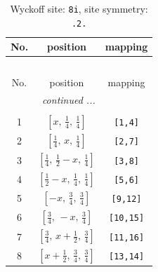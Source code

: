 \documentclass[fleqn,8pt]{jsarticle}
\begin{document}
\begin{longtable}{ccc}
\caption{Wyckoff site: {\tt 8i}, site symmetry: {\tt .2.}}
 \\
 \hline \hline
No. & position & mapping \\ \hline \endfirsthead

\multicolumn{2}{l}{\tablename\ \thetable{}} \\
 \hline \hline
No. & position & mapping \\ \hline \endhead

 \hline \hline
\multicolumn{2}{r}{\footnotesize\it continued ...} \\ \endfoot

 \hline \hline
\multicolumn{2}{r}{} \\ \endlastfoot

1 & $\left[ x,\, \frac{1}{4},\, \frac{1}{4} \right]$ & {\tt [1,4]} \\ \hline
2 & $\left[ \frac{1}{4},\, x,\, \frac{1}{4} \right]$ & {\tt [2,7]} \\ \hline
3 & $\left[ \frac{1}{4},\, \frac{1}{2} - x,\, \frac{1}{4} \right]$ & {\tt [3,8]} \\ \hline
4 & $\left[ \frac{1}{2} - x,\, \frac{1}{4},\, \frac{1}{4} \right]$ & {\tt [5,6]} \\ \hline
5 & $\left[ - x,\, \frac{3}{4},\, \frac{3}{4} \right]$ & {\tt [9,12]} \\ \hline
6 & $\left[ \frac{3}{4},\, - x,\, \frac{3}{4} \right]$ & {\tt [10,15]} \\ \hline
7 & $\left[ \frac{3}{4},\, x + \frac{1}{2},\, \frac{3}{4} \right]$ & {\tt [11,16]} \\ \hline
8 & $\left[ x + \frac{1}{2},\, \frac{3}{4},\, \frac{3}{4} \right]$ & {\tt [13,14]} \\
\end{longtable}
\renewcommand{\arraystretch}{1.2}
\end{document}
